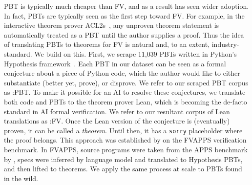 PBT is typically much cheaper than FV, and as a result has seen wider adoption.
In fact, PBTs are typically seen as the first step toward FV. 
For example, in the interactive theorem prover ACL2s~\cite{dillinger2007acl2s}, any unproven theorem statement is automatically treated as a PBT until the author supplies a proof. 
Thus the idea of translating PBTs to theorems for FV is natural and, to an extent, industry-standard. We build on this. 
First, we scrape 11{,}039 PBTs written in Python's Hypothesis framework~\cite{maciver2019hypothesis}. 
Each PBT in our dataset can be seen as a formal conjecture about a piece of Python code, which the author would like to either substantiate (better yet, prove), or disprove. 
We refer to our scraped PBT corpus as \FVSpec:PBT.
To make it possible for an AI to resolve these conjectures, 
we translate both code and PBTs to the theorem prover Lean, which is becoming the de-facto standard in AI formal verification. 
We refer to our resultant corpus of Lean translations as \FVSpec:FV.
Once the Lean version of the conjecture is (eventually) proven, it can be called a \emph{theorem}.
Until then, it has a \texttt{sorry} placeholder where the proof belongs.
This approach was established by \citet{dougherty2025proving} on the FVAPPS verification benchmark. In FVAPPS, source programs were taken from the APPS benchmark by \citet{hendrycks2021apps}, specs were inferred by language model and translated to Hypothesis PBTs, and then lifted to theorems. We apply the same process at scale to PBTs found in the wild.


